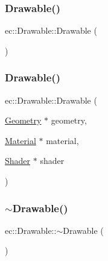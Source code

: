 \subsubsection{\texorpdfstring{Drawable()}{Drawable()}\hspace{0.1cm}{\footnotesize\ttfamily [1/2]}}
{\footnotesize\ttfamily ec\+::\+Drawable\+::\+Drawable (\begin{DoxyParamCaption}{ }\end{DoxyParamCaption})\hspace{0.3cm}{\ttfamily [explicit]}}

\mbox{\label{classec_1_1_drawable_a0155615048b762f6d0db09ef93bf604a}} 
\subsubsection{\texorpdfstring{Drawable()}{Drawable()}\hspace{0.1cm}{\footnotesize\ttfamily [2/2]}}
{\footnotesize\ttfamily ec\+::\+Drawable\+::\+Drawable (\begin{DoxyParamCaption}\item[{\mbox{\hyperlink{classec_1_1_geometry}{Geometry}} $\ast$}]{geometry,  }\item[{\mbox{\hyperlink{classec_1_1_material}{Material}} $\ast$}]{material,  }\item[{\mbox{\hyperlink{classec_1_1_shader}{Shader}} $\ast$}]{shader }\end{DoxyParamCaption})\hspace{0.3cm}{\ttfamily [explicit]}}

\mbox{\label{classec_1_1_drawable_a4a82e5cd6d6a47ad86ed42cfdda512d8}} 
\subsubsection{\texorpdfstring{$\sim$\+Drawable()}{~Drawable()}}
{\footnotesize\ttfamily ec\+::\+Drawable\+::$\sim$\+Drawable (\begin{DoxyParamCaption}{ }\end{DoxyParamCaption})\hspace{0.3cm}{\ttfamily [virtual]}}



